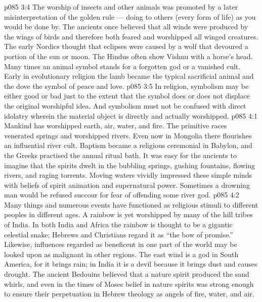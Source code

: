 \vs p085 3:4 The worship of insects and other animals was promoted by a later misinterpretation of the golden rule --- doing to others (every form of life) as you would be done by. The ancients once believed that all winds were produced by the wings of birds and therefore both feared and worshipped all winged creatures. The early Nordics thought that eclipses were caused by a wolf that devoured a portion of the sun or moon. The Hindus often show Vishnu with a horse’s head. Many times an animal symbol stands for a forgotten god or a vanished cult. Early in evolutionary religion the lamb became the typical sacrificial animal and the dove the symbol of peace and love.
\vs p085 3:5 In religion, symbolism may be either good or bad just to the extent that the symbol does or does not displace the original worshipful idea. And symbolism must not be confused with direct idolatry wherein the material object is directly and actually worshipped.
\vs p085 4:1 Mankind has worshipped earth, air, water, and fire. The primitive races venerated springs and worshipped rivers. Even now in Mongolia there flourishes an influential river cult. Baptism became a religious ceremonial in Babylon, and the Greeks practised the annual ritual bath. It was easy for the ancients to imagine that the spirits dwelt in the bubbling springs, gushing fountains, flowing rivers, and raging torrents. Moving waters vividly impressed these simple minds with beliefs of spirit animation and supernatural power. Sometimes a drowning man would be refused succour for fear of offending some river god.
\vs p085 4:2 Many things and numerous events have functioned as religious stimuli to different peoples in different ages. A rainbow is yet worshipped by many of the hill tribes of India. In both India and Africa the rainbow is thought to be a gigantic celestial snake; Hebrews and Christians regard it as “the bow of promise.” Likewise, influences regarded as beneficent in one part of the world may be looked upon as malignant in other regions. The east wind is a god in South America, for it brings rain; in India it is a devil because it brings dust and causes drought. The ancient Bedouins believed that a nature spirit produced the sand whirls, and even in the times of Moses belief in nature spirits was strong enough to ensure their perpetuation in Hebrew theology as angels of fire, water, and air.
